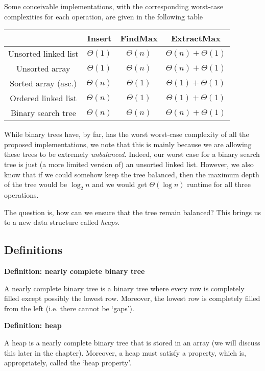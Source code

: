 \documentclass[11pt]{article}
\begin{document}
Some conceivable implementations, with the corresponding worst-case complexities for each operation, are given in the following table  
\begin{center}
\begin{tabular}{|c|c|c|c|}
\hline
     & Insert & FindMax & ExtractMax \\ \hline
    Unsorted linked list & $\Theta(1)$ & $\Theta(n)$ & $\Theta(n) + \Theta(1)$ \\ \hline Unsorted array & $\Theta(1)$ & $\Theta(n)$ & $\Theta(n) + \Theta(1)$ \\
    \hline Sorted array (asc.) & $\Theta(n)$ & $\Theta(1)$ & $\Theta(1) + \Theta(1)$ \\
    \hline Ordered linked list & $\Theta(n)$ & $\Theta(1)$ & $\Theta(1) + \Theta(1)$\\
    \hline Binary search tree & $\Theta(n)$ & $\Theta(n)$ & $\Theta(n) + \Theta(1)$ \\ \hline 
\end{tabular}
\end{center}
While binary trees have, by far, has the worst worst-case complexity of all the proposed implementations, we note that this is mainly because we are allowing these trees to be extremely \emph{unbalanced}. Indeed, our worst case for a binary search tree is just (a more limited version of) an unsorted linked list. However, we also know that if we could somehow keep the tree balanced, then the maximum depth of the tree would be $\log_2 n$ and we would get $\Theta(\log n)$ runtime for all three operations. 

The question is, how can we ensure that the tree remain balanced? This brings us to a new data structure called \emph{heaps}. 

\subsection{Definitions}
\textbf{Definition: nearly complete binary tree}

A nearly complete binary tree is a binary tree where every row is completely filled except possibly the lowest row. Moreover, the lowest row is completely filled from the left (i.e. there cannot be `gaps'). 

\textbf{Definition: heap}

A heap is a nearly complete binary tree that is stored in an array (we will discuss this later in the chapter). Moreover, a heap must satisfy a property, which is, appropriately, called the `heap property'.  
\end{document}
